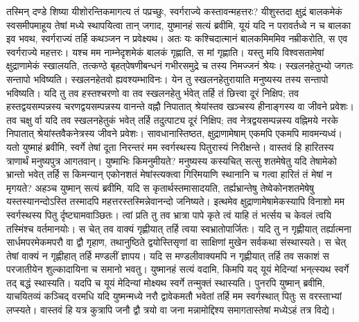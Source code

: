 \adhyAya
{}
\vakya तस्मिन् दण्डे शिष्या यीशोरन्तिकमागत्य तं पप्रच्छुः, स्वर्गराज्ये कस्तावन्महत्तरः?
\vakya यीशुस्तदा क्षुद्रं बालकमेकं स्वसमीपमाहूय तेषां मध्ये स्थापयित्वा तान् जगाद,
\vakya युष्मानहं सत्यं ब्रवीमि, यूयं यदि न परावर्तध्वे न च बालका इव भवथ, स्वर्गराज्यं तर्हि कथञ्जन न प्रवेक्ष्यथ।
\vakya अतः यः कश्चिदात्मानं बालकमिममिव नम्रीकरोति, स एव स्वर्गराज्ये महत्तरः।
\vakya यश्च मम नाम्नेदृशमेकं बालकं गृह्णाति, स मां गृह्णाति।
\vakya यस्तु मयि विश्वसतामेषां क्षुद्राणामेकं स्खालयति, तत्कण्ठे बृहत्‌पेषणीबन्धनं गभीरसमुद्रे च तस्य निमज्जनं श्रेयः।
\vakya स्खलनहेतुभ्यो जगतः सन्तापो भविष्यति। स्खलनहेतवो ह्यवश्यम्भाविनः। येन तु स्खलनहेतुरायाति मनुष्यस्य तस्य सन्तापो भविष्यति।
\vakya यदि तु तव हस्तश्चरणो वा तव स्खलनहेतु र्भवेत् तर्हि तं छित्त्वा दूरं निक्षिप; तव हस्तद्वयसम्पन्नस्य चरणद्वयसम्पन्नस्य वानन्ते वह्नौ निपातात् श्रेयांस्तव खञ्चस्य हीनाङ्गस्य वा जीवने प्रवेशः।
\vakya तव चक्षु र्वा यदि तव स्खलनहेतुकं भवेत् तर्हि तदुत्पाट्य दूरं निक्षिप; तव नेत्रद्वयसम्पन्नस्य वह्निमये नरके निपातात् श्रेयांस्तवैकनेत्रस्य जीवने प्रवेशः।
\vakya सावधानास्तिष्ठत, क्षुद्राणामेषाम् एकमपि एकमपि मावमन्यध्वं।
\vakya यतो युष्माहं ब्रवीमि, स्वर्गे तेषां दूता निरन्तरं मम स्वर्गस्थस्य पितुरास्यं निरीक्षन्ते। वास्तवं हि हारितस्य त्राणार्थं मनुष्यपुत्र आगतवान्।
\vakya युष्माभिः किमनुमीयते? मनुष्यस्य कस्यचित् सत्सु शतमेषेतु यदि तेषामेको भ्रान्तो भवेत् तर्हि स किमन्यान् एकोनशतं मेषांस्त्यक्त्वा गिरिमयाणि स्थानानि च गत्वा हारितं तं मेषां न मृगयते?
\vakya अहञ्च युष्मान् सत्यं ब्रवीमि, यदि स कृतार्थस्तमासादयति, तर्ह्यभ्रान्तेषु तेष्वेकोनशतमेषेषु यस्तस्यानन्दोऽस्ति तस्मादपि महत्तरस्तस्मिन्नेवानन्दो जनिष्यते।
\vakya इत्थमेव क्षुद्राणामेषामेकस्यापि विनाशो मम स्वर्गस्थस्य पितु र्दृष्ट्यामवाञ्छितः।
\vakya त्वां प्रति तु तव भ्रात्रा पापे कृते त्वं याहि तं भर्त्सय च केवलं त्वयि तस्मिंश्च वर्तमानयोः। स चेत् तव वाक्यं गृह्णीयात् तर्हि त्वया स्वभ्रातोपार्जितः।
\vakya यदि तु न गृह्णीयात् तर्ह्यात्मना सार्धमपरमेकमपरौ वा द्वौ गृहाण, तथानुष्ठिते द्वयोस्तिसृणां वा साक्षिणां मुखेन सर्वकथा संस्थास्यते।
\vakya स चेत् तेषां वाक्यं न गृह्णीहात् तर्हि मण्डलीं ज्ञापय। यदि स मण्डलीवाक्यमपि न गृह्णीयात् तर्हि तव सकाशं स परजातीयेन शुल्कादायिना च समानो भवतु।
\vakya युष्मानहं सत्यं वदामि, किमपि यद् यूयं मेदिन्यां भन्‌त्स्यथ स्वर्गे तद् बद्धं स्थास्यति। यदपि च यूयं मेदिन्यां मोक्ष्यथ स्वर्गे तन्मुक्तं स्थास्यति।
\vakya पुनरपि युष्मान् ब्रवीमि, याचयितव्यं कञ्चिद् वरमधि यदि युष्मन्मध्ये नरौ द्वावेकमतौ भवेतां तर्हि मम स्वर्गस्थात् पितुः स वरस्ताभ्यां लप्स्यते।
\vakya वास्तवं हि यत्र कुत्रापि जनौ द्वौ त्रयो वा जना मन्नामोद्दिश्य समागतास्तेषां मध्येऽहं तत्र विद्ये।
